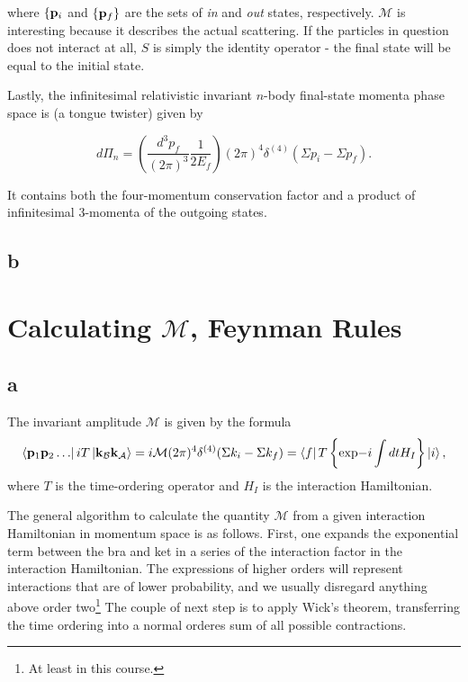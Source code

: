 \documentclass[11pt, a4paper]{amsart}
\begin{document}
where $\{\vb{p}_i$ and $\{\vb{p}_f\}$ are the sets of \emph{in} and \emph{out} states, respectively. $\mathcal{M}$ is interesting because it describes the actual scattering. If the particles in question does not interact at all, $S$ is simply the identity operator - the final state will be equal to the initial state.

Lastly, the infinitesimal relativistic invariant $n$-body final-state momenta phase space is (a tongue twister) given by

\begin{equation}
\label{eq:phasespace}
d\Pi_n = \left(\frac{d^3p_f}{(2\pi)^3} \frac{1}{2E_f}\right) (2\pi)^4 \delta^{(4)}(\Sigma p_i - \Sigma p_f).
\end{equation}

It contains both the four-momentum conservation factor and a product of infinitesimal 3-momenta of the outgoing states.

\subsection*{b}

\section{Calculating $\mathcal{M}$, Feynman Rules}

\subsection*{a}

The invariant amplitude $\mathcal{M}$ is given by the formula
\begin{equation}
\bra{\vb{p}_1 \vb{p}_2 \dots} iT \ket{\vb{k}_{\mathcal{B}}\vb{k}_{\mathcal{A}}} = i \mathcal{M} (2\pi)^4 \delta^{(4)}(\Sigma k_i -\Sigma  k_f)
= \bra{f}T\left\{\text{exp}{-i\int dt H_I} \right\} \ket{i},
\end{equation}
where $T$ is the time-ordering operator and $H_I$ is the interaction Hamiltonian.

The general algorithm to calculate the quantity $\mathcal{M}$ from a given interaction Hamiltonian in momentum space is as follows. First, one expands the exponential term between the bra and ket in a series of the interaction factor in the interaction Hamiltonian. The expressions of higher orders will represent interactions that are of lower probability, and we usually disregard anything above order two\footnote{At least in this course.} The couple of next step is to apply Wick's theorem, transferring the time ordering into a normal orderes sum of all possible contractions.
\end{document}
